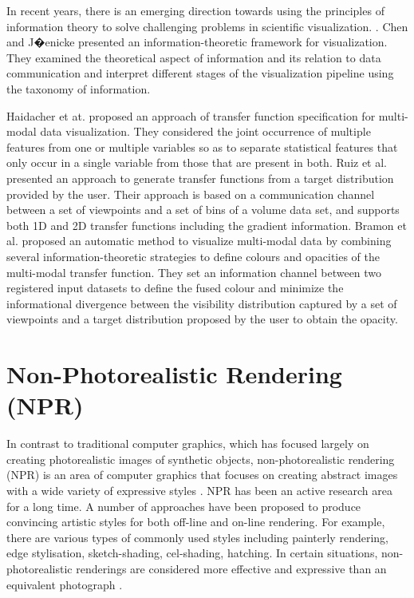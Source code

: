 In recent years, there is an emerging direction towards using the principles of information theory to solve challenging problems in scientific visualization. \cite{wang_information_2011}. Chen and J�enicke \cite{chen_information-theoretic_2010} presented an information-theoretic framework for visualization. They examined the theoretical aspect of information and its relation to data communication and interpret different stages of the visualization pipeline using the taxonomy of information.

Haidacher et at. \cite{haidacher_information-based_2008} proposed an approach of transfer function specification for multi-modal data visualization. They considered the joint occurrence of multiple features from one or multiple variables so as to separate statistical features that only occur in a single variable from those that are present in both.
Ruiz et al. \cite{ruiz_automatic_2011} presented an approach to generate transfer functions from a target distribution provided by the user. Their approach is based on a communication channel between a set of viewpoints and a set of bins of a volume data set, and supports both 1D and 2D transfer functions including the gradient information.
Bramon et al. \cite{bramon_information_2013} proposed an automatic method to visualize multi-modal data by combining several information-theoretic strategies to define colours and opacities of the multi-modal transfer function.
They set an information channel between two registered input datasets to define the fused colour and minimize the informational divergence between the visibility distribution captured by a set of viewpoints and a target distribution proposed by the user to obtain the opacity.

\section{Non-Photorealistic Rendering (NPR)}
In contrast to traditional computer graphics, which has focused largely on creating photorealistic images of synthetic objects, non-photorealistic rendering (NPR) is an area of computer graphics that focuses on creating abstract images with a wide variety of expressive styles \cite{haeberli_paint_1990}. NPR has been an active research area for a long time. A number of approaches have been proposed to produce convincing artistic styles for both off-line and on-line rendering. For example, there are various types of commonly used styles including painterly rendering, edge stylisation, sketch-shading, cel-shading, hatching.
In certain situations, non-photorealistic renderings are considered more effective and expressive than an equivalent photograph \cite{healey_perceptually_2004}.

